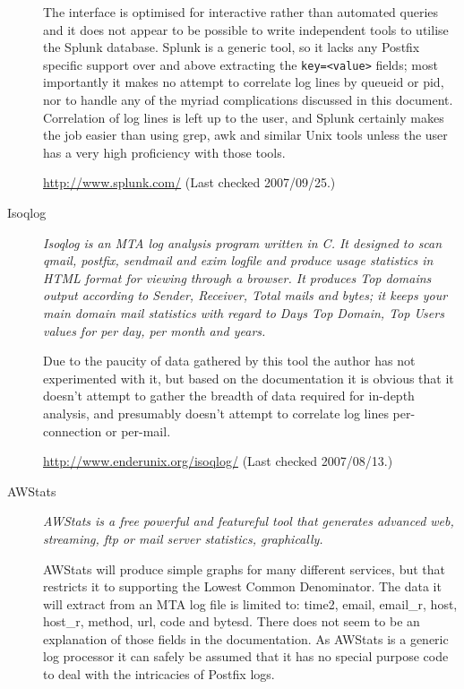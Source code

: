 \documentclass[a4paper,12pt,draft]{article}
\begin{document}
\begin{description}
        The interface is optimised for interactive rather than automated
        queries and it does not appear to be possible to write independent
        tools to utilise the Splunk database.  Splunk is a generic tool, so
        it lacks any Postfix specific support over and above extracting
        the \texttt{key=<value>} fields; most importantly it makes no
        attempt to correlate log lines by queueid or pid, nor to handle any
        of the myriad complications discussed in this document.
        Correlation of log lines is left up to the user, and Splunk
        certainly makes the job easier than using grep, awk and similar
        Unix tools unless the user has a very high proficiency with those
        tools.

        \url{http://www.splunk.com/} \newline (Last checked 2007/09/25.)

    \item [Isoqlog] \textit{Isoqlog is an MTA log analysis program written
        in C. It designed to scan qmail, postfix, sendmail and exim logfile
        and produce usage statistics in HTML format for viewing through a
        browser. It produces Top domains output according to Sender,
        Receiver, Total mails and bytes; it keeps your main domain mail
        statistics with regard to Days Top Domain, Top Users values for per
        day, per month and years.\/}

        Due to the paucity of data gathered by this tool the author has not
        experimented with it, but based on the documentation it is obvious
        that it doesn't attempt to gather the breadth of data required for
        in-depth analysis, and presumably doesn't attempt to correlate log
        lines per-connection or per-mail.

        \url{http://www.enderunix.org/isoqlog/} \newline (Last checked
        2007/08/13.)

    \item [AWStats] \textit{AWStats is a free powerful and featureful tool
        that generates advanced web, streaming, ftp or mail server
        statistics, graphically.\/}
        
        AWStats will produce simple graphs for many different services, but
        that restricts it to supporting the Lowest Common Denominator.  The
        data it will extract from an MTA log file is limited to: \newline
        \hspace*{2em} time2, email, email\_r, host, host\_r, method, url,
        code and bytesd.  \newline  There does not seem to be an
        explanation of those fields in the documentation.  As AWStats is a
        generic log processor it can safely be assumed that it has
        no special purpose code to deal with the intricacies of Postfix
        logs.


\end{description}
\end{document}
